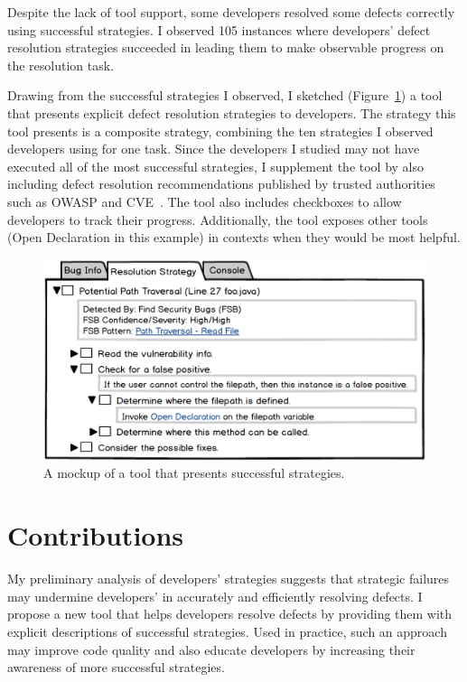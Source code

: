 \documentclass{sig-alternate}
\begin{document}
Despite the lack of tool support, some developers resolved some defects correctly using successful strategies. I observed 105 instances where developers' defect resolution strategies succeeded in leading them to make observable progress on the resolution task.

Drawing from the successful strategies I observed, I sketched (Figure~\ref{fig:tool}) a tool that presents explicit defect resolution strategies to developers. 
The strategy this tool presents is a composite strategy, combining the ten strategies I observed developers using for one task.
Since the developers I studied may not have executed all of the most successful strategies, I supplement the tool by also including defect resolution recommendations published by trusted authorities such as OWASP and CVE~\cite{OWASP, CVE}.
The tool also includes checkboxes to allow developers to track their progress.
Additionally, the tool exposes other tools (Open Declaration in this example) in contexts when they would be most helpful.

\begin{figure}
	\centering
	\includegraphics[width=\columnwidth]{images/toolscreenshot}
	\caption{A mockup of a tool that presents successful strategies.}
	\label{fig:tool} 
\end{figure}



\section{Contributions}
%
My preliminary analysis of developers' strategies suggests that strategic failures may undermine developers' in accurately and efficiently resolving defects.  
I propose a new tool that helps developers resolve defects by providing them with explicit descriptions of successful strategies.
Used in practice, such an approach may improve code quality and also educate developers by increasing their awareness of more successful strategies.






%
\end{document}
